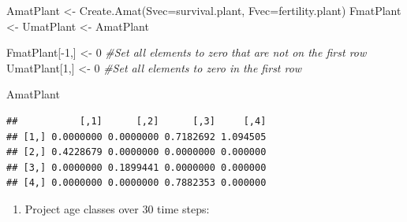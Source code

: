 \documentclass[
]{book}
\newenvironment{Shaded}{\begin{snugshade}}{\end{snugshade}}
\newcommand{\AttributeTok}[1]{\textcolor[rgb]{0.77,0.63,0.00}{#1}}
\newcommand{\CommentTok}[1]{\textcolor[rgb]{0.56,0.35,0.01}{\textit{#1}}}
\newcommand{\DecValTok}[1]{\textcolor[rgb]{0.00,0.00,0.81}{#1}}
\newcommand{\FunctionTok}[1]{\textcolor[rgb]{0.00,0.00,0.00}{#1}}
\newcommand{\NormalTok}[1]{#1}
\newcommand{\OtherTok}[1]{\textcolor[rgb]{0.56,0.35,0.01}{#1}}
\newcommand{\SpecialCharTok}[1]{\textcolor[rgb]{0.00,0.00,0.00}{#1}}
\providecommand{\tightlist}{%
  \setlength{\itemsep}{0pt}\setlength{\parskip}{0pt}}
\begin{document}
\begin{Shaded}
\begin{Highlighting}[]
\NormalTok{AmatPlant }\OtherTok{\textless{}{-}} \FunctionTok{Create.Amat}\NormalTok{(}\AttributeTok{Svec=}\NormalTok{survival.plant, }\AttributeTok{Fvec=}\NormalTok{fertility.plant)}
\NormalTok{FmatPlant }\OtherTok{\textless{}{-}}\NormalTok{ UmatPlant }\OtherTok{\textless{}{-}}\NormalTok{ AmatPlant}

\NormalTok{FmatPlant[}\SpecialCharTok{{-}}\DecValTok{1}\NormalTok{,] }\OtherTok{\textless{}{-}} \DecValTok{0} \CommentTok{\#Set all elements to zero that are not on the first row}
\NormalTok{UmatPlant[}\DecValTok{1}\NormalTok{,] }\OtherTok{\textless{}{-}} \DecValTok{0} \CommentTok{\#Set all elements to zero in the first row}

\NormalTok{AmatPlant}
\end{Highlighting}
\end{Shaded}

\begin{verbatim}
##           [,1]      [,2]      [,3]     [,4]
## [1,] 0.0000000 0.0000000 0.7182692 1.094505
## [2,] 0.4228679 0.0000000 0.0000000 0.000000
## [3,] 0.0000000 0.1899441 0.0000000 0.000000
## [4,] 0.0000000 0.0000000 0.7882353 0.000000
\end{verbatim}

\begin{enumerate}
\def\labelenumi{\arabic{enumi}.}
\setcounter{enumi}{3}
\tightlist
\item
  Project age classes over 30 time steps:
\end{enumerate}
\end{document}

